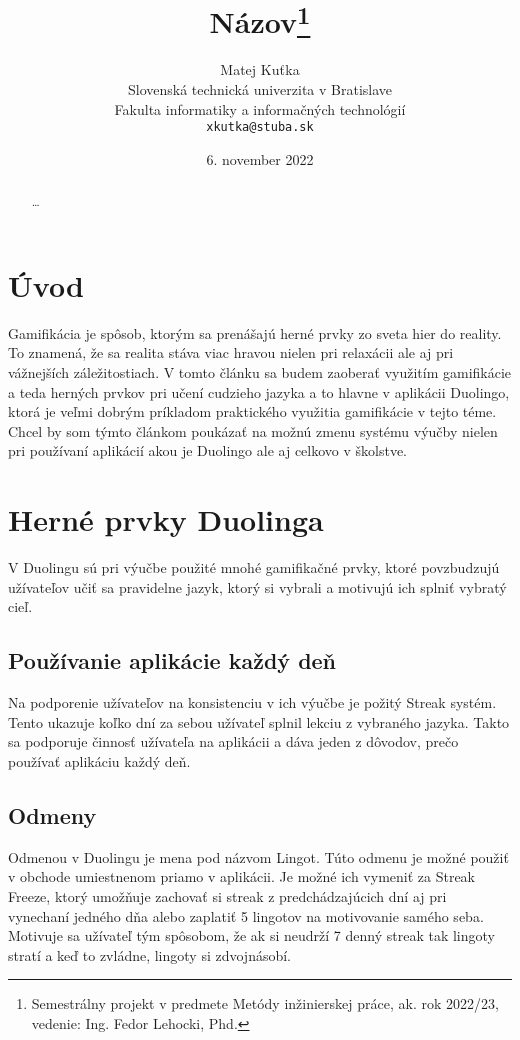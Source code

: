 \documentclass[10pt,oneside,slovak,a4paper]{article}
\title{Názov\thanks{Semestrálny projekt v predmete Metódy inžinierskej práce, ak. rok 2022/23, vedenie: Ing. Fedor Lehocki, Phd.}}
\author{Matej Kuťka\\[2pt]
	{\small Slovenská technická univerzita v Bratislave}\\
	{\small Fakulta informatiky a informačných technológií}\\
	{\small \texttt{xkutka@stuba.sk}}
	}
\date{\small 6. november 2022}
\begin{document}
\maketitle

\begin{abstract}
\ldots
\end{abstract}

\section{Úvod}

Gamifikácia je spôsob, ktorým sa prenášajú herné prvky zo sveta hier do reality. To znamená, že sa realita stáva viac hravou nielen pri relaxácii ale aj pri vážnejších záležitostiach. V tomto článku sa budem zaoberať využitím gamifikácie a teda herných prvkov pri učení cudzieho jazyka a to hlavne v aplikácii Duolingo, ktorá je veľmi dobrým príkladom praktického využitia gamifikácie v tejto téme. Chcel by som týmto článkom poukázať na možnú zmenu systému výučby nielen pri používaní aplikácií akou je Duolingo ale aj celkovo v školstve.

\section{Herné prvky Duolinga}
V Duolingu sú pri výučbe použité mnohé gamifikačné prvky, ktoré povzbudzujú užívateľov učiť sa pravidelne jazyk, ktorý si vybrali a motivujú ich splniť vybratý cieľ.

\subsection{Používanie aplikácie každý deň}
Na podporenie užívateľov na konsistenciu v ich výučbe je požitý Streak systém. Tento ukazuje koľko dní za sebou užívateľ splnil lekciu z vybraného jazyka. Takto sa podporuje činnosť užívateľa na aplikácii a dáva jeden z dôvodov, prečo používať aplikáciu každý deň.

\subsection{Odmeny}
Odmenou v Duolingu je mena pod názvom Lingot. Túto odmenu je možné použiť v obchode umiestnenom priamo v aplikácii. Je možné ich vymeniť za Streak Freeze, ktorý umožňuje zachovať si streak z predchádzajúcich dní aj pri vynechaní jedného dňa alebo zaplatiť 5 lingotov na motivovanie samého seba. Motivuje sa užívateľ tým spôsobom, že ak si neudrží 7 denný streak tak lingoty stratí a keď to zvládne, lingoty si zdvojnásobí. 
\end{document}
